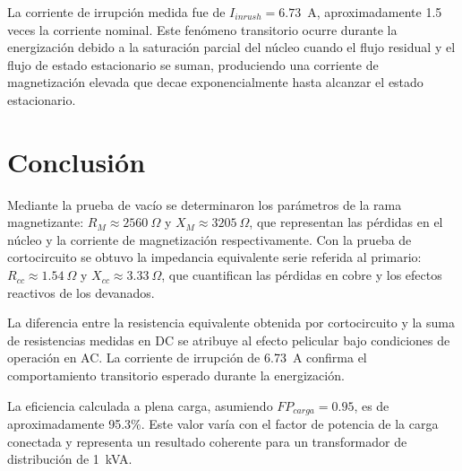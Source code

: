 \documentclass[conference]{IEEEtran}
\begin{document}
La corriente de irrupción medida fue de $I_{inrush} = 6.73$~A, aproximadamente 1.5 veces la corriente nominal. Este fenómeno transitorio ocurre durante la energización debido a la saturación parcial del núcleo cuando el flujo residual y el flujo de estado estacionario se suman, produciendo una corriente de magnetización elevada que decae exponencialmente hasta alcanzar el estado estacionario.

\section{Conclusión}

Mediante la prueba de vacío se determinaron los parámetros de la rama magnetizante: $R_M \approx 2560\ \Omega$ y $X_M \approx 3205\ \Omega$, que representan las pérdidas en el núcleo y la corriente de magnetización respectivamente. Con la prueba de cortocircuito se obtuvo la impedancia equivalente serie referida al primario: $R_{cc} \approx 1.54\ \Omega$ y $X_{cc} \approx 3.33\ \Omega$, que cuantifican las pérdidas en cobre y los efectos reactivos de los devanados.

La diferencia entre la resistencia equivalente obtenida por cortocircuito y la suma de resistencias medidas en DC se atribuye al efecto pelicular bajo condiciones de operación en AC. La corriente de irrupción de 6.73~A confirma el comportamiento transitorio esperado durante la energización.

La eficiencia calculada a plena carga, asumiendo $FP_{carga} = 0.95$, es de aproximadamente 95.3\%. Este valor varía con el factor de potencia de la carga conectada y representa un resultado coherente para un transformador de distribución de 1~kVA.



\end{document}
